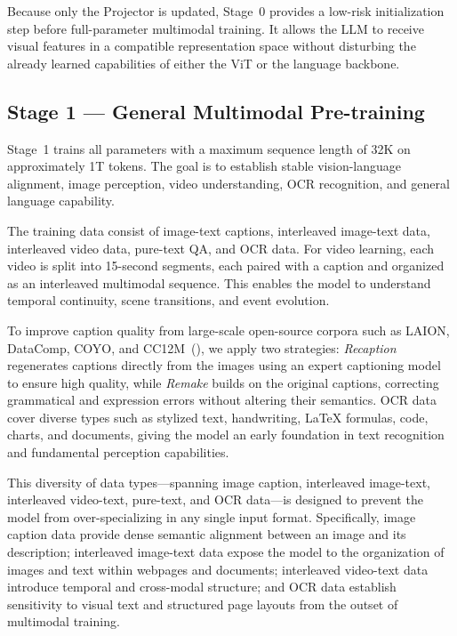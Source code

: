 \documentclass{llmxive}
\begin{document}
Because only the Projector is updated, Stage~0 provides a low-risk initialization step before full-parameter multimodal training. It allows the LLM to receive visual features in a compatible representation space without disturbing the already learned capabilities of either the ViT or the language backbone.

\subsection{Stage 1 --- General Multimodal Pre-training}

Stage~1 trains all parameters with a maximum sequence length of 32K on approximately 1T tokens. The goal is to establish stable vision-language alignment, image perception, video understanding, OCR recognition, and general language capability.


The training data consist of image-text captions, interleaved image-text data, interleaved video data, pure-text QA, and OCR data. For video learning, each video is split into 15-second segments, each paired with a caption and organized as an interleaved multimodal sequence. This enables the model to understand temporal continuity, scene transitions, and event evolution.


To improve caption quality from large-scale open-source corpora such as LAION, DataComp, COYO, and CC12M~(\cite{laion,datacomp,coyo,cc12m}), we apply two strategies: \emph{Recaption} regenerates captions directly from the images using an expert captioning model to ensure high quality, while \emph{Remake} builds on the original captions, correcting grammatical and expression errors without altering their semantics. OCR data cover diverse types such as stylized text, handwriting, LaTeX formulas, code, charts, and documents, giving the model an early foundation in text recognition and fundamental perception capabilities.


This diversity of data types—spanning image caption, interleaved image-text, interleaved video-text, pure-text, and OCR data—is designed to prevent the model from over-specializing in any single input format. Specifically, image caption data provide dense semantic alignment between an image and its description; interleaved image-text data expose the model to the organization of images and text within webpages and documents; interleaved video-text data introduce temporal and cross-modal structure; and OCR data establish sensitivity to visual text and structured page layouts from the outset of multimodal training.
\end{document}
